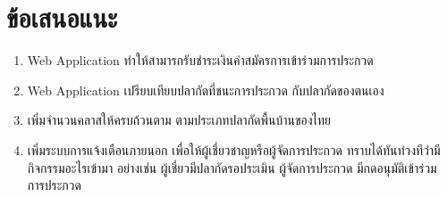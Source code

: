 \section*{ข้อเสนอแนะ}

\begin{sloppypar}
	\begin{enumerate}
		\item Web Application ทำให้สามารถรับชำระเงินค่าสมัครการเข้าร่วมการประกวด
		\item Web Application เปรียบเทียบปลากัดที่ชนะการประกวด กับปลากัดของตนเอง
		\item เพิ่มจำนวนคลาสให้ครบถ้วนตาม ตามประเภทปลากัดพื้นบ้านของไทย
		\item เพิ่มระบบการแจ้งเตือนภายนอก เพื่อให้ผู้เชี่ยวชาญหรือผู้จัดการประกวด ทราบได้ทันท่วงทีว่ามี
		กิจกรรมอะไรเข้ามา อย่างเช่น ผู้เชี่ยวมีปลากัดรอประเมิน ผู้จัดการประกวด มีกดอนุมัติเข้าร่วม
		การประกวด
	\end{enumerate}
\end{sloppypar}
